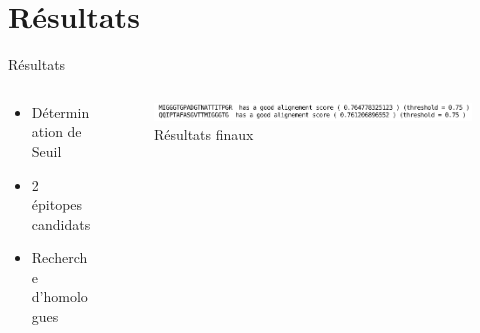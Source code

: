 \documentclass{PresentationHEIGVD}
\begin{document}
\section{Résultats}
\begin{frame}{Résultats}
\begin{columns}[c]
	\begin{column}[c]{5cm}
		\begin{itemize}[<+->]
			\item Détermination de Seuil
			\item 2 épitopes candidats
			\item Recherche d'homologues
		\end{itemize}
	\end{column}
	\begin{column}[c]{5cm}
		\begin{figure}
		\includegraphics[width=\textwidth]{img/results.png}
		\caption{Résultats finaux}
		\end{figure}
	\end{column}
\end{columns}

\end{frame}
\end{document}

